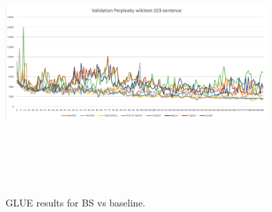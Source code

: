 \begin{figure}[h]
\centering
\includegraphics[width=10cm, height=10cm]{Thesis/images/wiki103-sentence-valid.png}
\caption{GLUE results for BS vs baseline.}
\end{figure}
